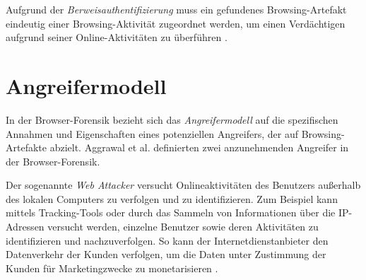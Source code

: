 Aufgrund der \textit{Berweisauthentifizierung} muss ein gefundenes Browsing-Artefakt eindeutig einer Browsing-Aktivität zugeordnet werden, um einen Verdächtigen aufgrund seiner Online-Aktivitäten zu überführen \cite{Mahlous.2020}. 



%
%

\section{Angreifermodell}\label{chap:theorie-angreifermodell}

In der Browser-Forensik bezieht sich das \textit{Angreifermodell} auf die spezifischen Annahmen und Eigenschaften eines potenziellen Angreifers, der auf Browsing-Artefakte abzielt. Aggrawal et al. \cite{Aggarwal.2010} definierten zwei anzunehmenden Angreifer in der Browser-Forensik.

Der sogenannte \textit{Web Attacker} versucht Onlineaktivitäten des Benutzers außerhalb des lokalen Computers zu verfolgen und zu identifizieren. Zum Beispiel kann mittels Tracking-Tools oder durch das Sammeln von Informationen über die IP-Adressen versucht werden, einzelne Benutzer sowie deren Aktivitäten zu identifizieren und nachzuverfolgen. So kann der Internetdienstanbieter den Datenverkehr der Kunden verfolgen, um die Daten unter Zustimmung der Kunden für Marketingzwecke zu monetarisieren \cite{Aggarwal.2010}. 


